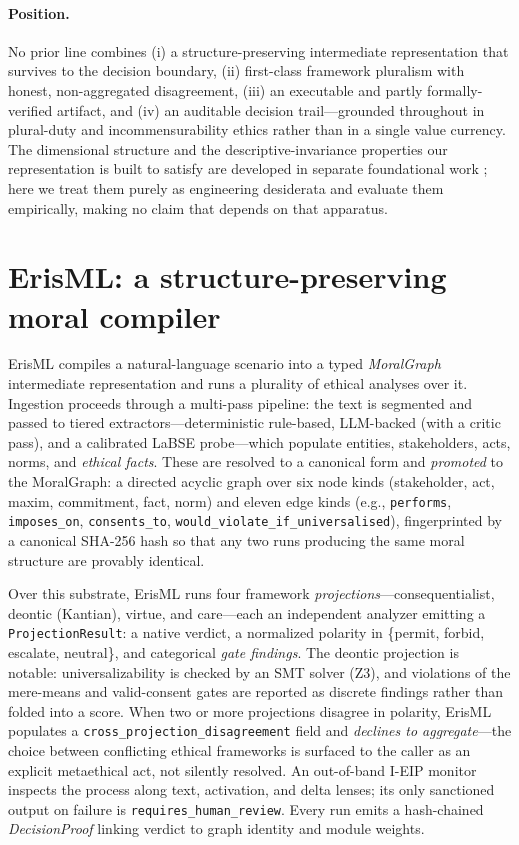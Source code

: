 \paragraph{Position.}
No prior line combines (i) a structure-preserving intermediate representation that survives
to the decision boundary, (ii) first-class framework pluralism with honest, non-aggregated
disagreement, (iii) an executable and partly formally-verified artifact, and (iv) an
auditable decision trail---grounded throughout in plural-duty and incommensurability ethics
rather than in a single value currency. The dimensional structure and the
descriptive-invariance properties our representation is built to satisfy are developed in
separate foundational work \citep{bond_geometric_ethics}; here we treat them purely as
engineering desiderata and evaluate them empirically, making no claim that depends on that
apparatus.

\section{ErisML: a structure-preserving moral compiler}
\label{sec:erisml}

ErisML compiles a natural-language scenario into a typed \emph{MoralGraph} intermediate
representation and runs a plurality of ethical analyses over it. Ingestion proceeds through
a multi-pass pipeline: the text is segmented and passed to tiered extractors---deterministic
rule-based, LLM-backed (with a critic pass), and a calibrated LaBSE probe---which populate
entities, stakeholders, acts, norms, and \emph{ethical facts}. These are resolved to a
canonical form and \emph{promoted} to the MoralGraph: a directed acyclic graph over six node
kinds (stakeholder, act, maxim, commitment, fact, norm) and eleven edge kinds (e.g.,
\texttt{performs}, \texttt{imposes\_on}, \texttt{consents\_to},
\texttt{would\_violate\_if\_universalised}), fingerprinted by a canonical SHA-256 hash so
that any two runs producing the same moral structure are provably identical.

Over this substrate, ErisML runs four framework \emph{projections}---consequentialist,
deontic (Kantian), virtue, and care---each an independent analyzer emitting a
\texttt{ProjectionResult}: a native verdict, a normalized polarity in
\{permit, forbid, escalate, neutral\}, and categorical \emph{gate findings}. The deontic
projection is notable: universalizability is checked by an SMT solver (Z3), and violations of
the mere-means and valid-consent gates are reported as discrete findings rather than folded
into a score. When two or more projections disagree in polarity, ErisML populates a
\texttt{cross\_projection\_disagreement} field and \emph{declines to aggregate}---the choice
between conflicting ethical frameworks is surfaced to the caller as an explicit metaethical
act, not silently resolved. An out-of-band I-EIP monitor inspects the process along text,
activation, and delta lenses; its only sanctioned output on failure is
\texttt{requires\_human\_review}. Every run emits a hash-chained \emph{DecisionProof} linking
verdict to graph identity and module weights.


